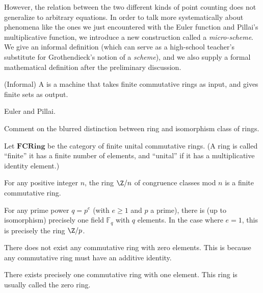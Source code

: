 However, the relation between the two different kinds of point counting does not generalize to arbitrary equations. In order to talk more systematically about phenomena like the ones we just encountered with the Euler function and Pillai's multiplicative function, we introduce a new construction called a \emph{micro-scheme}. We give an informal definition (which can serve as a high-school teacher's substitute for Grothendieck's notion of a \emph{scheme}), and we also supply a formal mathematical definition after the preliminary discussion.

\begin{definition}
(Informal) A  is a machine that takes finite commutative rings as input, and gives finite sets as output.
\end{definition}

\begin{example}
Euler and Pillai.
\end{example}




Comment on the blurred distinction between ring and isomorphism class of rings.

\begin{definition}
Let $\mathbf{FCRing}$ be the category of finite unital commutative rings. (A ring is called ``finite'' it has a finite number of elements, and ``unital'' if it has a multiplicative identity element.)
\end{definition}

\begin{example}
For any positive integer $n$, the ring $\Z / n$ of congruence classes mod $n$ is a finite commutative ring.
\end{example}

\begin{example}
For any prime power $q = p^e$ (with $e \geq 1$ and $p$ a prime), there is (up to isomorphism) precisely one field $\mathbb{F}_q$ with $q$ elements. In the case where $e=1$, this is precisely the ring $\Z / p$.
\end{example}

\begin{example}
There does not exist any commutative ring with zero elements. This is because any commutative ring must have an additive identity.
\end{example}

\begin{example}
There exists precisely one commutative ring with one element. This ring is usually called the zero ring.
\end{example}




